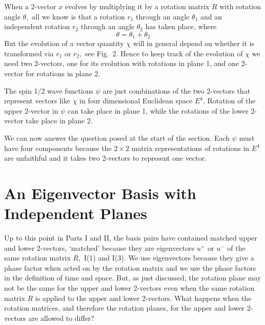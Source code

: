 \documentclass[a4paper,12pt]{article}
\begin{document}
	When a 2-vector $x$ evolves by multiplying it by a rotation matrix $R$ with rotation angle $\theta,$ all we know is that a rotation $r_{1}$ through an angle $\theta_{1}$ and an independent rotation $r_{2}$ through an angle $\theta_{2}$ has taken place, where
\begin{equation}	\label{1+2}
\theta = \theta_{1} + \theta_{2}
\end{equation}
But the evolution of a vector quantity $\chi$ will in general depend on whether it is transformed via $r_{1}$ or $r_{2},$ see Fig.~2. Hence to keep track of the evolution of $\chi$ we need two 2-vectors, one for its evolution with rotations in plane 1, and one 2-vector for rotations in plane 2. 

	The spin 1/2 wave functions $\psi$ are just combinations of the two 2-vectors that represent vectors like $\chi$ in four dimensional Euclidean space $E^{4}.$  Rotation of the upper 2-vector in $\psi$ can take place in plane 1, while the rotations of the lower 2-vector take place in plane 2. 

	We can now answer the question posed at the start of the section. Each $\psi$ must have four components because the $2 \times 2$ matrix representations of rotations in $E^{4}$ are unfaithful and it takes two 2-vectors to represent one vector.


\section{An Eigenvector Basis with Independent Planes} \label{sectionortho}%

	Up to this point in Parts I and II, the basis pairs have contained matched upper and lower 2-vectors, `matched' because they are eigenvectors $u^{+}$ or $u^{-}$ of the same rotation matrix $R,$ I(1) and I(3). We use eigenvectors because they give a phase factor when acted on by the rotation matrix and we use the phase factors in the definition of time and space. But, as just discussed, the rotation plane may not be the same for the upper and lower 2-vectors even when the same rotation matrix $R$ is applied to the upper and lower 2-vectors. What happens when the rotation matrices, and therefore the rotation planes, for the upper and lower 2-vectors are allowed to differ? 
\end{document}
